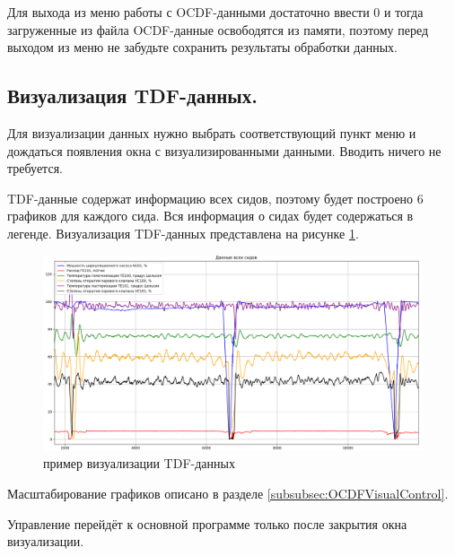 {\standartFont

  \par Для выхода из меню работы с OCDF-данными достаточно ввести 0 и тогда загруженные из файла OCDF-данные освободятся из памяти, поэтому перед выходом из меню не забудьте сохранить результаты обработки данных.

  \par
}

\subsection{ \standartTitleFont
  Визуализация TDF-данных.
} \label{subsubsec:TDFVisual}

{\standartFont

  \par Для визуализации данных нужно выбрать соответствующий пункт меню и дождаться появления окна с визуализированными данными. Вводить ничего не требуется.

  \par TDF-данные содержат информацию всех сидов, поэтому будет построено 6 графиков для каждого сида. Вся информация о сидах будет содержаться в легенде. Визуализация TDF-данных представлена на рисунке \ref{fig:TDFVisual}.

  \begin{figure}[H]
    \centering
    \includegraphics[width=\textwidth]{images/forDataManipulator/TDFVisual.png}
    \caption{пример визуализации TDF-данных}
    \label{fig:TDFVisual}
  \end{figure}

  \par Масштабирование графиков описано в разделе \ref{subsubsec:OCDFVisualControl}.

  \par Управление перейдёт к основной программе только после закрытия окна визуализации.

  \par
}

